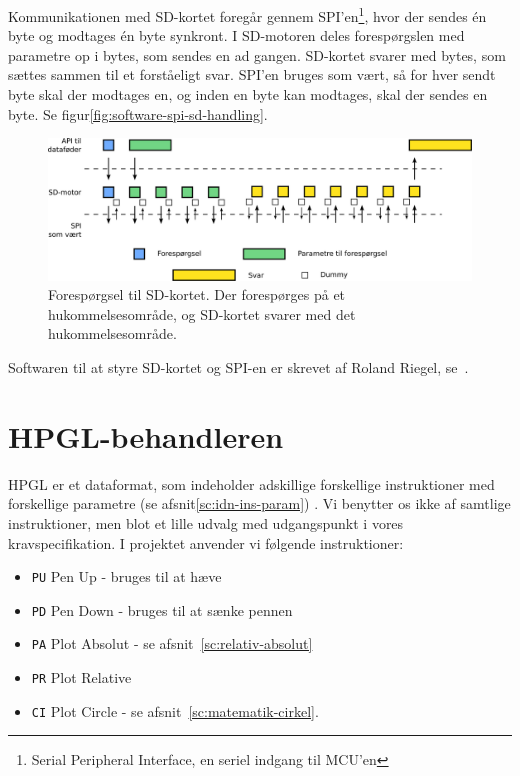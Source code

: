 Kommunikationen med SD-kortet foregår gennem SPI'en\footnote{Serial
  Peripheral Interface, en seriel indgang til MCU'en}, hvor der sendes
én byte og modtages én byte synkront. I SD-motoren deles forespørgslen
med parametre op i bytes, som sendes en ad gangen. SD-kortet svarer
med bytes, som sættes sammen til et forståeligt svar. SPI'en bruges
som vært, så for hver sendt byte skal der modtages en, og inden en
byte kan modtages, skal der sendes en byte. Se
figur\vref{fig:software-spi-sd-handling}.

\begin{figure}[htbp]
  \centering
  \includegraphics[width=\textwidth]{../brugere/kjaergaard/datafeeder-handling}
  \caption{Forespørgsel til SD-kortet. Der forespørges på et
    hukommelsesområde, og SD-kortet svarer med det hukommelsesområde.}
  \label{fig:software-spi-sd-handling}
\end{figure}


Softwaren til at styre SD-kortet og SPI-en er skrevet af Roland
Riegel, se~\cite{bbt:sd-software}.


\section{HPGL-behandleren}


HPGL er et dataformat, som indeholder adskillige forskellige
instruktioner med forskellige parametre (se
afsnit\vref{sc:idn-ins-param}) . Vi benytter os ikke af samtlige
instruktioner, men blot et lille udvalg med udgangspunkt i vores
kravspecifikation. I projektet anvender vi følgende instruktioner:

\begin{itemize} \firmlist
\item \texttt{PU} Pen Up - bruges til at hæve
\item \texttt{PD} Pen Down - bruges til at sænke pennen
\item \texttt{PA} Plot Absolut - se afsnit~\vref{sc:relativ-absolut}
\item \texttt{PR} Plot Relative
\item \texttt{CI} Plot Circle - se afsnit~\vref{sc:matematik-cirkel}.
\end{itemize}


